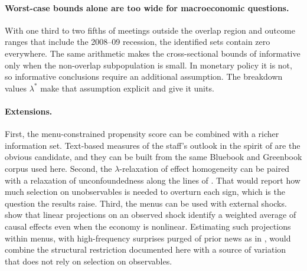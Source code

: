 \paragraph{Worst-case bounds alone are too wide for macroeconomic questions.} With one third to two fifths of
meetings outside the overlap region and outcome ranges that include the 2008--09 recession, the identified sets
contain zero everywhere. The same arithmetic makes the cross-sectional bounds of \citet{susmann2025} informative
only when the non-overlap subpopulation is small. In monetary policy it is not, so informative conclusions require
an additional assumption. The breakdown values $\lambda^\ast$ make that assumption explicit and give it units.

\paragraph{Extensions.} First, the menu-constrained propensity score can be combined with a richer information set.
Text-based measures of the staff's outlook in the spirit of \citet{aruoba2025} are the obvious candidate, and they
can be built from the same Bluebook and Greenbook corpus used here. Second, the $\lambda$-relaxation of effect
homogeneity can be paired with a relaxation of unconfoundedness along the lines of \citet{masten2018}. That would
report how much selection on unobservables is needed to overturn each sign, which is the question the results raise.
Third, the menus can be used with external shocks. \citet{kolesar2025} show that linear projections on an observed
shock identify a weighted average of causal effects even when the economy is nonlinear. Estimating such projections
within menus, with high-frequency surprises purged of prior news as in \citet{bauer2023nber}, would combine the
structural restriction documented here with a source of variation that does not rely on selection on observables.
